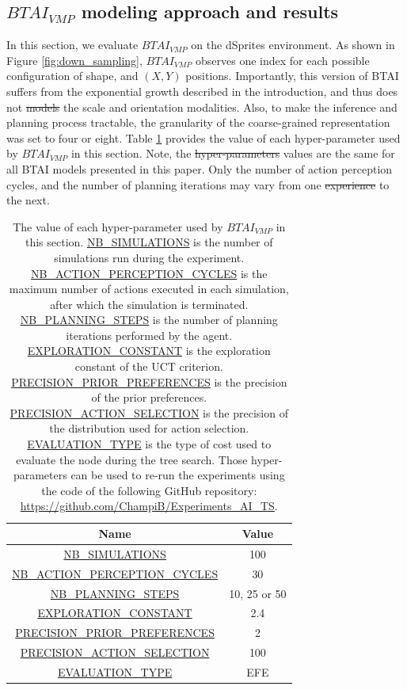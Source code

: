 \documentclass[twoside,11pt]{article}
\providecommand{\DIFadd}[1]{{\protect\color{blue}\uwave{#1}}} %
\providecommand{\DIFdel}[1]{{\protect\color{red}\sout{#1}}}                      %
\providecommand{\DIFaddbegin}{} %
\providecommand{\DIFaddend}{} %
\providecommand{\DIFdelbegin}{} %
\providecommand{\DIFdelend}{} %
\begin{document}
\subsection{$BTAI_{VMP}$ modeling approach and results} \label{ssec:btai_vmp}

In this section, we evaluate $BTAI_{VMP}$ \citep{AITS_THEORY,AITS_PRACTICE} on the dSprites environment. As shown in Figure \ref{fig:down_sampling}, $BTAI_{VMP}$ observes one index for each possible configuration of shape, and $(X, Y)$ positions. Importantly, this version of BTAI suffers from the exponential growth described in the introduction, and thus does not \DIFdelbegin \DIFdel{models }\DIFdelend \DIFaddbegin \DIFadd{model }\DIFaddend the scale and orientation modalities. Also, to make the inference and planning process tractable, the granularity of the coarse-grained representation was set to four or eight. Table \ref{tab:values_hp_BTAI_dSprites} provides the value of each hyper-parameter used by $BTAI_{VMP}$ in this section. Note, the \DIFdelbegin \DIFdel{hyper-parameters }\DIFdelend \DIFaddbegin \DIFadd{hyper-parameter }\DIFaddend values are the same for all BTAI models presented in this paper. Only the number of action perception cycles, and the number of planning iterations may vary from one \DIFdelbegin \DIFdel{experience }\DIFdelend \DIFaddbegin \DIFadd{experiment }\DIFaddend to the next.

\begin{table}[H]
\centering
\begin{tabular}{ |c|c|  }
 \hline
 Name & Value\\
 \hline
 \hline
 \url{NB_SIMULATIONS} & 100\\
 \hline
 \url{NB_ACTION_PERCEPTION_CYCLES} & 30\\
 \hline
 \url{NB_PLANNING_STEPS} & 10, 25 or 50\\
 \hline
 \url{EXPLORATION_CONSTANT} & 2.4\\
 \hline
 \url{PRECISION_PRIOR_PREFERENCES} & 2\\
 \hline
 \url{PRECISION_ACTION_SELECTION} & 100\\
 \hline
 \url{EVALUATION_TYPE} & EFE\\
 \hline
\end{tabular}
\caption{The value of each hyper-parameter used by $BTAI_{VMP}$ in this section. \url{NB_SIMULATIONS} is the number of simulations run during the experiment. \url{NB_ACTION_PERCEPTION_CYCLES} is the maximum number of actions executed in each simulation, after which the simulation is terminated. \url{NB_PLANNING_STEPS} is the number of planning iterations performed by the agent. \url{EXPLORATION_CONSTANT} is the exploration constant of the UCT criterion. \url{PRECISION_PRIOR_PREFERENCES} is the precision of the prior preferences. \url{PRECISION_ACTION_SELECTION} is the precision of the distribution used for action selection. \url{EVALUATION_TYPE} is the type of cost used to evaluate the node during the tree search. Those hyper-parameters can be used to re-run the experiments using the code of the following GitHub repository: \url{https://github.com/ChampiB/Experiments_AI_TS}.}
\label{tab:values_hp_BTAI_dSprites}
\end{table}
\end{document}
